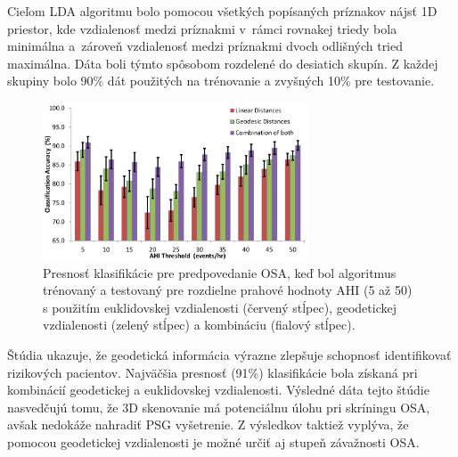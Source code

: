 Cieľom LDA algoritmu bolo pomocou všetkých popísaných príznakov nájsť 1D priestor, kde vzdialenosť medzi príznakmi v rámci rovnakej triedy bola minimálna a zároveň vzdialenosť medzi príznakmi dvoch odlišných tried maximálna. Dáta boli týmto spôsobom rozdelené do desiatich skupín. Z každej skupiny bolo 90\% dát použitých na trénovanie a zvyšných 10\% pre testovanie. 

\begin{figure}[h]
	\centering
	\includegraphics[width=0.7\textwidth]{figures/resers_l.png}
	\caption{Presnosť klasifikácie pre predpovedanie OSA, keď bol algoritmus trénovaný a testovaný pre rozdielne prahové hodnoty AHI (5 až 50) s použitím euklidovskej vzdialenosti (červený stĺpec), geodetickej vzdialenosti (zelený stĺpec) a kombináciu (fialový stĺpec). }
	\label{fig:resers:l}
\end{figure}

Štúdia ukazuje, že geodetická informácia výrazne zlepšuje schopnosť identifikovať rizikových pacientov. Najväčšia presnosť (91\%) klasifikácie bola získaná pri kombinácií geodetickej a euklidovskej vzdialenosti. Výsledné dáta tejto štúdie nasvedčujú tomu, že 3D skenovanie má potenciálnu úlohu pri skríningu OSA, avšak nedokáže nahradiť PSG vyšetrenie. Z výsledkov taktiež vyplýva, že pomocou geodetickej vzdialenosti je možné určiť aj stupeň závažnosti OSA.
